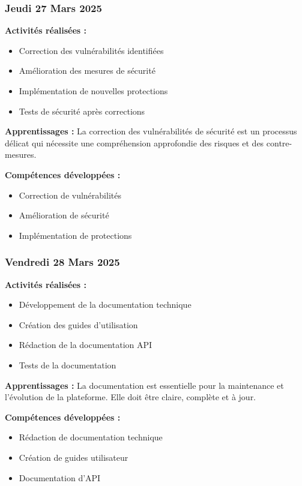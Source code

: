 \documentclass[12pt,a4paper]{article}
\begin{document}
\subsubsection{Jeudi 27 Mars 2025}
\textbf{Activités réalisées :}
\begin{itemize}
    \item Correction des vulnérabilités identifiées
    \item Amélioration des mesures de sécurité
    \item Implémentation de nouvelles protections
    \item Tests de sécurité après corrections
\end{itemize}

\textbf{Apprentissages :}
La correction des vulnérabilités de sécurité est un processus délicat qui nécessite une compréhension approfondie des risques et des contre-mesures.

\textbf{Compétences développées :}
\begin{itemize}
    \item Correction de vulnérabilités
    \item Amélioration de sécurité
    \item Implémentation de protections
\end{itemize}

\subsubsection{Vendredi 28 Mars 2025}
\textbf{Activités réalisées :}
\begin{itemize}
    \item Développement de la documentation technique
    \item Création des guides d'utilisation
    \item Rédaction de la documentation API
    \item Tests de la documentation
\end{itemize}

\textbf{Apprentissages :}
La documentation est essentielle pour la maintenance et l'évolution de la plateforme. Elle doit être claire, complète et à jour.

\textbf{Compétences développées :}
\begin{itemize}
    \item Rédaction de documentation technique
    \item Création de guides utilisateur
    \item Documentation d'API
\end{itemize}
\end{document}
